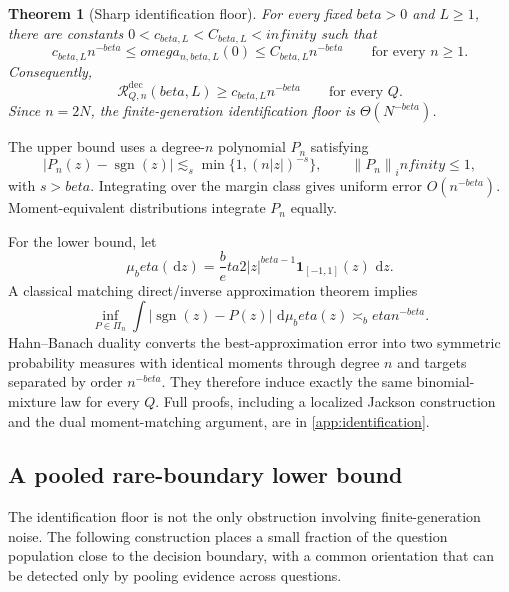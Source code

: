 \documentclass[11pt]{article}
\def\beta{beta}%
\def\omega{omega}%
\def\infty{infinity}%
\newtheorem{theorem}{Theorem}[section]
\newcommand{\one}{\mathbf 1}
\newcommand{\sgn}{\operatorname{sgn}}
\newcommand{\calR}{\mathcal R}
\newcommand{\norm}[1]{\left\lVert#1\right\rVert}
\newcommand{\dd}{\,\mathrm d}
\begin{document}
\begin{theorem}[Sharp identification floor]
\label{thm:identification-floor}
For every fixed $\beta>0$ and $L\ge1$, there are constants $0<c_{\beta,L}<C_{\beta,L}<\infty$ such that
\begin{equation}
\label{eq:identification-floor}
 c_{\beta,L}n^{-\beta}
\le
\omega_{n,\beta,L}(0)
\le
C_{\beta,L}n^{-\beta}
\qquad\text{for every }n\ge1.
\end{equation}
Consequently,
\begin{equation}
\label{eq:N-only-lower}
\calR^{\mathrm{dec}}_{Q,n}(\beta,L)
\ge c_{\beta,L}n^{-\beta}
\qquad\text{for every }Q.
\end{equation}
Since $n=2N$, the finite-generation identification floor is $\Theta(N^{-\beta})$.
\end{theorem}

The upper bound uses a degree-$n$ polynomial $P_n$ satisfying
\[
|P_n(z)-\sgn(z)|
\lesssim_s
\min\{1,(n|z|)^{-s}\},
\qquad \norm{P_n}_\infty\le1,
\]
with $s>\beta$.  Integrating over the margin class gives uniform error $O(n^{-\beta})$.  Moment-equivalent distributions integrate $P_n$ equally.

For the lower bound, let
\[
\mu_\beta(\dd z)
=
\frac\beta2|z|^{\beta-1}\one_{[-1,1]}(z)\,\dd z.
\]
A classical matching direct/inverse approximation theorem implies
\begin{equation}
\label{eq:weighted-L1}
\inf_{P\in\Pi_n}
\int|\sgn(z)-P(z)|\,\dd\mu_\beta(z)
\asymp_\beta n^{-\beta}.
\end{equation}
Hahn--Banach duality converts the best-approximation error into two symmetric probability measures with identical moments through degree $n$ and targets separated by order $n^{-\beta}$.  They therefore induce exactly the same binomial-mixture law for every $Q$.  Full proofs, including a localized Jackson construction and the dual moment-matching argument, are in \cref{app:identification}.

\subsection{A pooled rare-boundary lower bound}

The identification floor is not the only obstruction involving finite-generation noise.  The following construction places a small fraction of the question population close to the decision boundary, with a common orientation that can be detected only by pooling evidence across questions.
\end{document}

